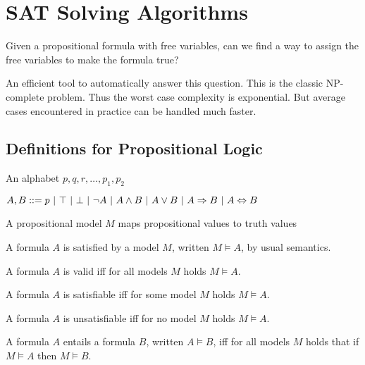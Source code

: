 \section{SAT Solving Algorithms}
\begin{mytitle} Given a propositional formula with free variables, can we find a way to assign the free variables to make the formula true?
\end{mytitle}
\begin{mytitle} An efficient tool to automatically answer this question. This is the classic NP-complete problem. Thus the worst case complexity is exponential. But average cases encountered in practice can be handled much faster.
\end{mytitle}
\subsection{Definitions for Propositional Logic}
\begin{mytitle} An alphabet $p, q, r, \ldots, p_1, p_2$
\end{mytitle}
\begin{mytitle} $A, B ::= p\ |\ \top\ |\ \bot\ |\ \lnot A\ |\ A \land B\ |\ A \lor B\ |\ A \To B\ |\ A \Leftrightarrow B$
\end{mytitle}
\begin{mytitle} A propositional model $M$ maps propositional values to truth values
\end{mytitle}
\begin{mytitle}[Satisfaction] A formula $A$ is satisfied by a model $M$, written $M \models A$, by usual semantics.
\end{mytitle}
\begin{mytitle}[Validity] A formula $A$ is valid iff for all models $M$ holds $M \models A$.
\end{mytitle}
\begin{mytitle}[Satisfiability] A formula $A$ is satisfiable iff for some model $M$ holds $M \models A$.
\end{mytitle}
\begin{mytitle}[Unsatisfiability] A formula $A$ is unsatisfiable iff for no model $M$ holds $M \models A$.
\end{mytitle}
\begin{mytitle}[Entailment] A formula $A$ entails a formula $B$, written $A \models B$, iff for all models $M$ holds that if $M \models A$ then $M \models B$.
\end{mytitle}
